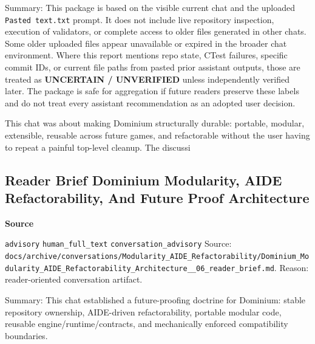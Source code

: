 \documentclass[9pt,a4paper,openany]{book}
\newcommand{\vonecallout}[3]{\par\medskip\noindent\begingroup\setlength{\fboxsep}{7pt}\colorbox{DomCalloutBg}{\parbox{0.94\linewidth}{\textbf{\textcolor{#1}{#2}}\par #3}}\endgroup\par\medskip}
\begin{document}
Summary: This package is based on the visible current chat and the uploaded \texttt{Pasted text.\allowbreak{}txt} prompt.\allowbreak{} It does not include live repository inspection, execution of validators, or complete access to older files generated in other chats.\allowbreak{} Some older uploaded files appear unavailable or expired in the broader chat environment.\allowbreak{} Where this report mentions repo state, CTest failures, specific commit IDs, or current file paths from pasted prior assistant outputs, those are treated as \textbf{UNCERTAIN / UNVERIFIED} unless independently verified later.\allowbreak{} The package is safe for aggregation if future readers preserve these labels and do not treat every assistant recommendation as an adopted user decision.\allowbreak{}


This chat was about making Dominium structurally durable: portable, modular, extensible, reusable across future games, and refactorable without the user having to repeat a painful top-\allowbreak{}level cleanup.\allowbreak{} The discussi



\subsection{Reader Brief Dominium Modularity, AIDE Refactorability, And Future Proof Architecture}

\vonecallout{DomSlate}{Source}{\texttt{advisory} \texttt{human\_\allowbreak{}full\_\allowbreak{}text} \texttt{conversation\_\allowbreak{}advisory} Source: \texttt{docs/\allowbreak{}archive/\allowbreak{}conversations/\allowbreak{}Modularity\_\allowbreak{}AIDE\_\allowbreak{}Refactorability/\allowbreak{}Dominium\_\allowbreak{}Modularity\_\allowbreak{}AIDE\_\allowbreak{}Refactorability\_\allowbreak{}Architecture\_\allowbreak{}\_\allowbreak{}06\_\allowbreak{}reader\_\allowbreak{}brief.\allowbreak{}md}.\allowbreak{} Reason: reader-\allowbreak{}oriented conversation artifact.\allowbreak{}}

Summary: This chat established a future-\allowbreak{}proofing doctrine for Dominium: stable repository ownership, AIDE-\allowbreak{}driven refactorability, portable modular code, reusable engine/\allowbreak{}runtime/\allowbreak{}contracts, and mechanically enforced compatibility boundaries.\allowbreak{}
\end{document}

